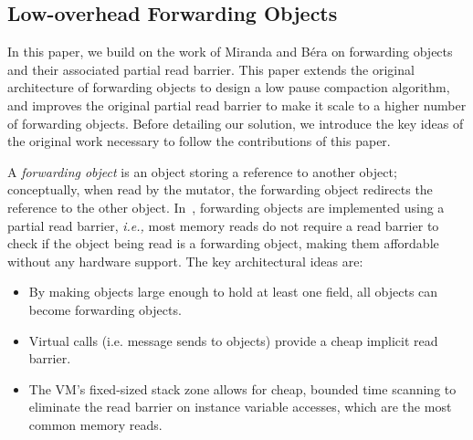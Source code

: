 \documentclass[sigplan,10pt,screen]{acmart}\settopmatter{printfolios=true,printccs=true,printacmref=true}
\def\ie{\emph{i.e., }}
\begin{document}


\subsection{Low-overhead Forwarding Objects}

In this paper, we build on the work of Miranda and B\'era \cite{Forwarders} on forwarding objects and their associated partial read barrier.
This paper extends the original architecture of forwarding objects to design a low pause compaction algorithm, and improves the original partial read barrier to make it scale to a higher number of forwarding objects.
Before detailing our solution, we introduce the key ideas of the original work necessary to follow the contributions of this paper. 

A \emph{forwarding object} is an object storing a reference to another object; conceptually, when read by the mutator, the forwarding object redirects the reference to the other object.
In~\cite{Forwarders}, forwarding objects are implemented using a partial read barrier, \ie most memory reads do not require a read barrier to check if the object being read is a forwarding object, making them affordable without any hardware support. 
The key architectural ideas are:
\begin{itemize}
	\item By making objects large enough to hold at least one field, all objects can become forwarding objects. 
	\item Virtual calls (i.e. message sends to objects) provide a cheap implicit read barrier.
	\item The VM's fixed-sized stack zone allows for cheap, bounded time scanning to eliminate the read barrier on instance variable accesses, which are the most common memory reads.
\end{itemize}
\end{document}
